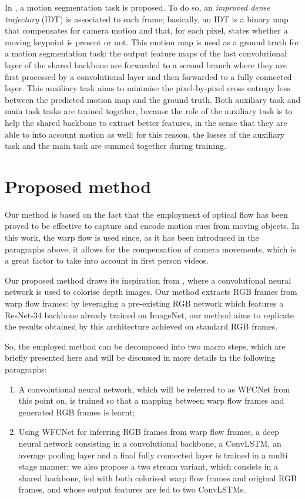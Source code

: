 \documentclass[10pt,twocolumn,letterpaper]{article}
\begin{document}
In \cite{planamente2020joint}, a motion segmentation task is proposed. To do so, an \textit{improved dense trajectory} (IDT) is associated to each frame; basically, an IDT is a binary map that compensates for camera motion and that, for each pixel, states whether a moving keypoint is present or not. This motion map is used as a ground truth for a motion segmentation task: the output feature maps of the last convolutional layer of the shared backbone are forwarded to a second branch where they are first processed by a convolutional layer and then forwarded to a fully connected layer. This auxiliary task aims to minimise the pixel-by-pixel cross entropy loss between the predicted motion map and the ground truth. Both auxiliary task and main task tasks are trained together, because the role of the auxiliary task is to help the shared backbone to extract better features, in the sense that they are able to into account motion as well: for this reason, the losses of the auxiliary task and the main task are summed together during training.


\section{Proposed method}
Our method is based on the fact that the employment of optical flow has been proved to be effective to capture and encode motion cues from moving objects. In this work, the warp flow is used since, as it has been introduced in the paragraphs above, it allows for the compensation of camera movements, which is a great factor to take into account in first person videos.

Our proposed method draws its inspiration from \cite{carlucci2017de2}, where a convolutional neural network is used to colorise depth images. Our method extracts RGB frames from warp flow frames: by leveraging a pre-existing RGB network which features a ResNet-34 backbone already trained on ImageNet, our method aims to replicate the results obtained by this architecture achieved on standard RGB frames.

So, the employed method can be decomposed into two macro steps, which are briefly presented here and will be discussed in more details in the following paragraphs:
\begin{enumerate}
	\item A convolutional neural network, which will be referred to as WFCNet from this point on, is trained so that a mapping between warp flow frames and generated RGB frames is learnt; 
	\item Using WFCNet for inferring RGB frames from warp flow frames, a deep neural network consisting in a convolutional backbone, a ConvLSTM, an average pooling layer and a final fully connected layer is trained in a multi stage manner; we also propose a two stream variant, which consists in a shared backbone, fed with both colorised warp flow frames and original RGB frames, and whose output features are fed to two ConvLSTMs.
\end{enumerate}
\end{document}
